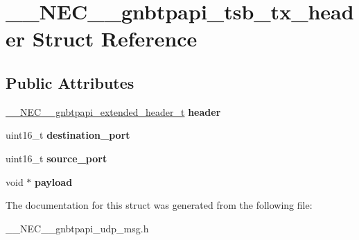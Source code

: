 \hypertarget{struct____NEC____gnbtpapi__tsb__tx__header}{\section{\-\_\-\-\_\-\-N\-E\-C\-\_\-\-\_\-gnbtpapi\-\_\-tsb\-\_\-tx\-\_\-header \-Struct \-Reference}
\label{struct____NEC____gnbtpapi__tsb__tx__header}
}
\subsection*{\-Public \-Attributes}
\begin{DoxyCompactItemize}
\item 
\hypertarget{struct____NEC____gnbtpapi__tsb__tx__header_acb92a450fac3989e6e2fdf27f247160c}{\hyperlink{struct____NEC____gnbtpapi__extended__header}{\-\_\-\-\_\-\-N\-E\-C\-\_\-\-\_\-gnbtpapi\-\_\-extended\-\_\-header\-\_\-t} {\bfseries header}}\label{struct____NEC____gnbtpapi__tsb__tx__header_acb92a450fac3989e6e2fdf27f247160c}

\item 
\hypertarget{struct____NEC____gnbtpapi__tsb__tx__header_adcf8231180cd01838ace532ea6ac768a}{uint16\-\_\-t {\bfseries destination\-\_\-port}}\label{struct____NEC____gnbtpapi__tsb__tx__header_adcf8231180cd01838ace532ea6ac768a}

\item 
\hypertarget{struct____NEC____gnbtpapi__tsb__tx__header_af1b1199d35433f4a4272a526013c428e}{uint16\-\_\-t {\bfseries source\-\_\-port}}\label{struct____NEC____gnbtpapi__tsb__tx__header_af1b1199d35433f4a4272a526013c428e}

\item 
\hypertarget{struct____NEC____gnbtpapi__tsb__tx__header_ac8bc4897ae0787bd3e07b3591c1cd515}{void $\ast$ {\bfseries payload}}\label{struct____NEC____gnbtpapi__tsb__tx__header_ac8bc4897ae0787bd3e07b3591c1cd515}

\end{DoxyCompactItemize}


\-The documentation for this struct was generated from the following file\-:\begin{DoxyCompactItemize}
\item 
\-\_\-\-\_\-\-N\-E\-C\-\_\-\-\_\-gnbtpapi\-\_\-udp\-\_\-msg.\-h\end{DoxyCompactItemize}
